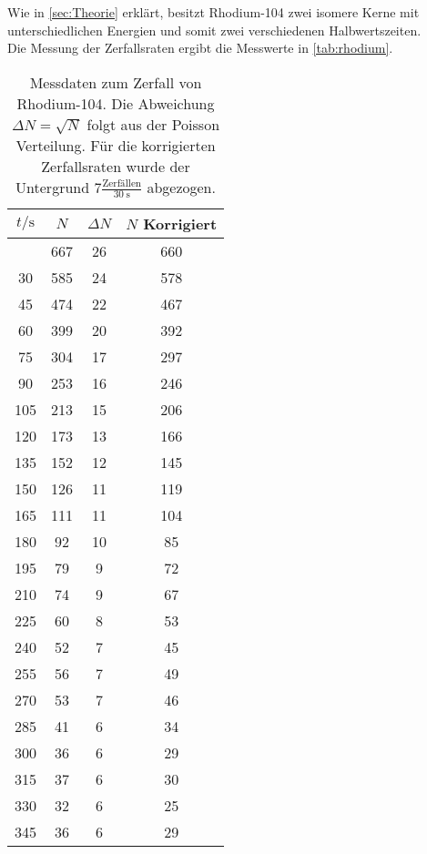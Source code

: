 Wie in \autoref{sec:Theorie} erklärt, besitzt Rhodium-104 zwei isomere Kerne mit unterschiedlichen 
Energien und somit zwei verschiedenen Halbwertszeiten.
\\
Die Messung der Zerfallsraten ergibt die Messwerte in \autoref{tab:rhodium}.
\begin{longtable}{c c c c}
	\caption{Messdaten zum Zerfall von Rhodium-104. Die Abweichung $\Delta N = \sqrt{N}$ folgt
		aus der Poisson Verteilung. Für die korrigierten Zerfallsraten wurde der Untergrund 
	$7 \frac{\text{Zerfällen}}{\SI{30}{\second}}$ abgezogen.} \label{tab:rhodium} \\
		\hline
		$t / \si{\second}$ & $N$ & $\Delta N$ &$N$ Korrigiert \\
		\hline
		\endhead
		\hline
		\endfoot
		15  	& 667  	& 26         	& 660 \\
		 30  	& 585  	& 24         	& 578 \\
		 45  	& 474  	& 22         	& 467 \\
		 60  	& 399  	& 20         	& 392 \\
		 75  	& 304  	& 17         	& 297 \\
		 90  	& 253  	& 16         	& 246 \\
		105  	& 213  	& 15         	& 206 \\
		120  	& 173  	& 13         	& 166 \\
		135  	& 152  	& 12         	& 145 \\
		150  	& 126  	& 11         	& 119 \\
		165  	& 111  	& 11         	& 104 \\
		180  	&  92  	& 10         	&  85 \\
		195  	&  79  	&  9         	&  72 \\
		210  	&  74  	&  9         	&  67 \\
		225  	&  60  	&  8         	&  53 \\
		240  	&  52  	&  7         	&  45 \\
		255  	&  56  	&  7         	&  49 \\
		270  	&  53  	&  7         	&  46 \\
		285  	&  41  	&  6         	&  34 \\
		300  	&  36  	&  6         	&  29 \\
		315  	&  37  	&  6         	&  30 \\
		330  	&  32  	&  6         	&  25 \\
		345  	&  36  	&  6         	&  29 \\

\end{longtable}
